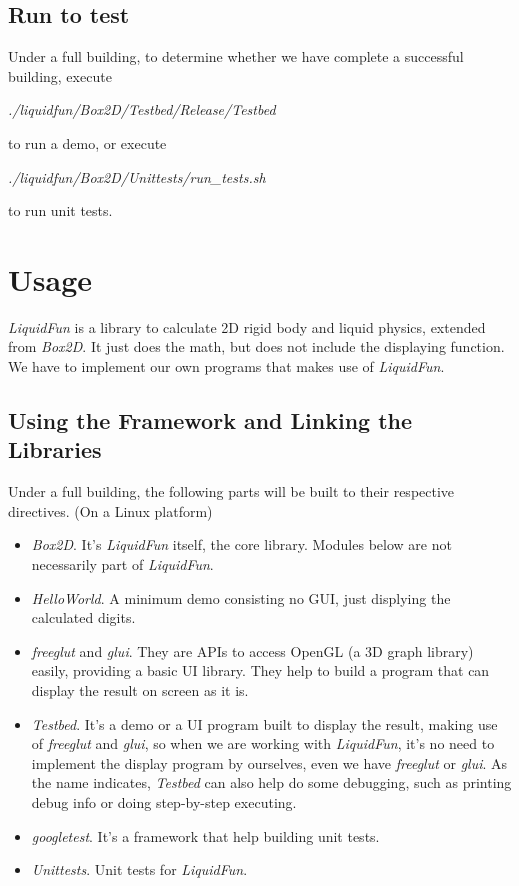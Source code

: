 \documentclass[UTF8]{ctexart}
\begin{document}
        \subsection{Run to test}

            Under a full building, to determine whether we have complete a successful building, execute
            
            \textit{./liquidfun/Box2D/Testbed/Release/Testbed}
            
            \noindent to run a demo, or execute
            
            \textit{./liquidfun/Box2D/Unittests/run\_tests.sh}
            
            \noindent to run unit tests.

    \section{Usage}

        \textit{LiquidFun} is a library to calculate 2D rigid body and liquid physics, extended from \textit{Box2D}. It just does the math, but does not include the displaying function. We have to implement our own programs that makes use of \textit{LiquidFun}.
        
        \subsection{Using the Framework and Linking the Libraries}

            Under a full building, the following parts will be built to their respective directives. (On a Linux platform)

            \begin{itemize}
                \item \textit{Box2D}. It's \textit{LiquidFun} itself, the core library. Modules below are not necessarily part of \textit{LiquidFun}.
                \item \textit{HelloWorld}. A minimum demo consisting no GUI, just displying the calculated digits.
                \item \textit{freeglut} and \textit{glui}. They are APIs to access OpenGL (a 3D graph library) easily, providing a basic UI library. They help to build a program that can display the result on screen as it is.
                \item \textit{Testbed}. It's a demo or a UI program built to display the result, making use of \textit{freeglut} and \textit{glui}, so when we are working with \textit{LiquidFun}, it's no need to implement the display program by ourselves, even we have \textit{freeglut} or \textit{glui}. As the name indicates, \textit{Testbed} can also help do some debugging, such as printing debug info or doing step-by-step executing.
                \item \textit{googletest}. It's a framework that help building unit tests.
                \item \textit{Unittests}. Unit tests for \textit{LiquidFun}.
            \end{itemize}
            
\end{document}
